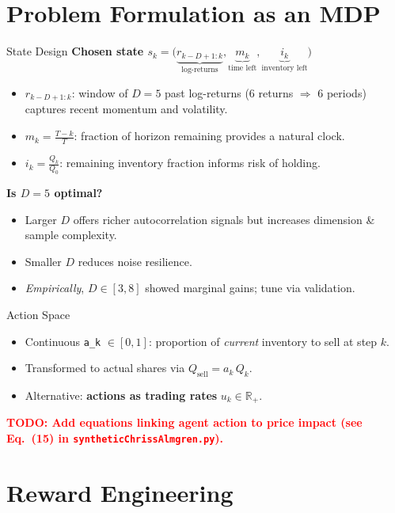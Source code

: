 \documentclass[11pt]{beamer}
\newcommand{\todo}[1]{\textcolor{red}{\bf TODO: #1}}
\newcommand{\code}[1]{\texttt{#1}}
\begin{document}
	\section{Problem Formulation as an MDP}
	
	\begin{frame}{State Design}
		\textbf{Chosen state $s_k = \big(\underbrace{r_{k-D+1:k}}_{\text{log-returns}}, \underbrace{m_k}_{\text{time left}}, \underbrace{i_k}_{\text{inventory left}}\big)$}
		\begin{itemize}
			\item $r_{k-D+1:k}$: window of $D=5$ past log-returns (6 returns $\Rightarrow$ 6 periods) captures recent momentum and volatility.
			\item $m_k=\tfrac{T-k}{T}$: fraction of horizon remaining provides a natural clock.
			\item $i_k=\tfrac{Q_k}{Q_0}$: remaining inventory fraction informs risk of holding.
		\end{itemize}
		\vspace{0.5em}
		\textbf{Is $D=5$ optimal?}
		\begin{itemize}
			\item Larger $D$ offers richer autocorrelation signals but increases dimension \& sample complexity.
			\item Smaller $D$ reduces noise resilience.
			\item \emph{Empirically}, $D \in [3,8]$ showed marginal gains; \alert{tune via validation}.
		\end{itemize}
	\end{frame}
	
	\begin{frame}{Action Space}
		\begin{itemize}
			\item Continuous \code{a\_k} $\in [0,1]$: proportion of \emph{current} inventory to sell at step $k$.
			\item Transformed to actual shares via $Q_{\mathrm{sell}}=a_k\,Q_{k}$.
			\item Alternative: \textbf{actions as trading rates} $u_k \in \mathbb{R}_+$.
		\end{itemize}
		\todo{Add equations linking agent action to price impact (see Eq.~(15) in \code{syntheticChrissAlmgren.py}).}
	\end{frame}
	
	\section{Reward Engineering}
	
\end{document}
